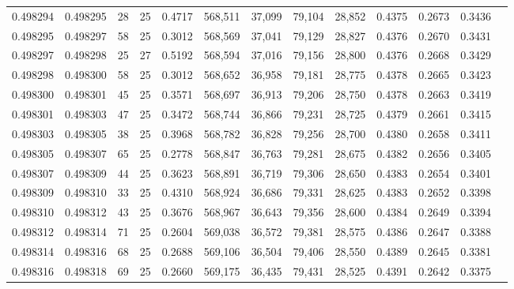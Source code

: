 \begin{tabular}{rrrrrrrrrrrrr}
0.498294 & 0.498295 &    28 &  25 &                                     0.4717 & 568,511 &  37,099 &  79,104 &  28,852 & 0.4375 & 0.2673 & 0.3436 \\
0.498295 & 0.498297 &    58 &  25 &                                     0.3012 & 568,569 &  37,041 &  79,129 &  28,827 & 0.4376 & 0.2670 & 0.3431 \\
0.498297 & 0.498298 &    25 &  27 &                                     0.5192 & 568,594 &  37,016 &  79,156 &  28,800 & 0.4376 & 0.2668 & 0.3429 \\
0.498298 & 0.498300 &    58 &  25 &                                     0.3012 & 568,652 &  36,958 &  79,181 &  28,775 & 0.4378 & 0.2665 & 0.3423 \\
0.498300 & 0.498301 &    45 &  25 &                                     0.3571 & 568,697 &  36,913 &  79,206 &  28,750 & 0.4378 & 0.2663 & 0.3419 \\
0.498301 & 0.498303 &    47 &  25 &                                     0.3472 & 568,744 &  36,866 &  79,231 &  28,725 & 0.4379 & 0.2661 & 0.3415 \\
0.498303 & 0.498305 &    38 &  25 &                                     0.3968 & 568,782 &  36,828 &  79,256 &  28,700 & 0.4380 & 0.2658 & 0.3411 \\
0.498305 & 0.498307 &    65 &  25 &                                     0.2778 & 568,847 &  36,763 &  79,281 &  28,675 & 0.4382 & 0.2656 & 0.3405 \\
0.498307 & 0.498309 &    44 &  25 &                                     0.3623 & 568,891 &  36,719 &  79,306 &  28,650 & 0.4383 & 0.2654 & 0.3401 \\
0.498309 & 0.498310 &    33 &  25 &                                     0.4310 & 568,924 &  36,686 &  79,331 &  28,625 & 0.4383 & 0.2652 & 0.3398 \\
0.498310 & 0.498312 &    43 &  25 &                                     0.3676 & 568,967 &  36,643 &  79,356 &  28,600 & 0.4384 & 0.2649 & 0.3394 \\
0.498312 & 0.498314 &    71 &  25 &                                     0.2604 & 569,038 &  36,572 &  79,381 &  28,575 & 0.4386 & 0.2647 & 0.3388 \\
0.498314 & 0.498316 &    68 &  25 &                                     0.2688 & 569,106 &  36,504 &  79,406 &  28,550 & 0.4389 & 0.2645 & 0.3381 \\
0.498316 & 0.498318 &    69 &  25 &                                     0.2660 & 569,175 &  36,435 &  79,431 &  28,525 & 0.4391 & 0.2642 & 0.3375 \\

\end{tabular}
